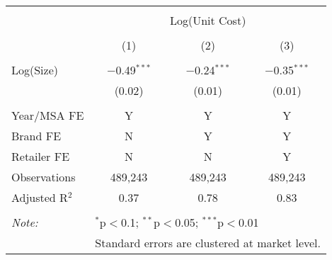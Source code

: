 
\begin{table}[!htbp] \centering 
  \caption{} 
  \label{tab:bulkDiscountUnitCost7020} 
\begin{tabular}{@{\extracolsep{5pt}}lccc} 
\\[-1.8ex]\hline 
\hline \\[-1.8ex] 
 & \multicolumn{3}{c}{Log(Unit Cost)} \\ 
\cline{2-4} 
\\[-1.8ex] & (1) & (2) & (3)\\ 
\hline \\[-1.8ex] 
 Log(Size) & $-$0.49$^{***}$ & $-$0.24$^{***}$ & $-$0.35$^{***}$ \\ 
  & (0.02) & (0.01) & (0.01) \\ 
 \hline \\[-1.8ex] 
Year/MSA FE & Y & Y & Y \\ 
Brand FE & N & Y & Y \\ 
Retailer FE & N & N & Y \\ 
Observations & 489,243 & 489,243 & 489,243 \\ 
Adjusted R$^{2}$ & 0.37 & 0.78 & 0.83 \\ 
\hline 
\hline \\[-1.8ex] 
\textit{Note:}  & \multicolumn{3}{l}{$^{*}$p$<$0.1; $^{**}$p$<$0.05; $^{***}$p$<$0.01} \\ 
 & \multicolumn{3}{l}{Standard errors are clustered at market level.} \\ 
\end{tabular} 
\end{table} 
